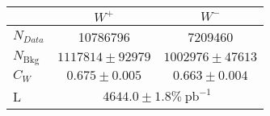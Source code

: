 
        \begin{tabular}{lcc}
      \hline
      \hline
       & $W^+$ & $W^-$ \\
      \hline
      $N_{Data}$       & 10786796                & 7209460  \\
      $N_{\mbox{Bkg}}$ & $1117814 \pm 92979$ & $1002976 \pm 47613$ \\
      $C_W$            & $0.675    \pm 0.005$   & $0.663    \pm 0.004$ \\
      L &  \multicolumn{2}{c}{$4644.0 \pm 1.8 \%\ \mbox{pb}^{-1}$} \\
      \hline
      \hline
    \end{tabular}

    
